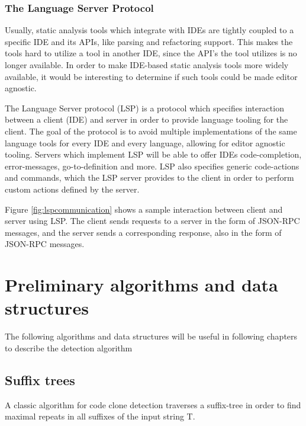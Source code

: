 \subsubsection{The Language Server Protocol}

Usually, static analysis tools which integrate with IDEs are tightly coupled to a specific
IDE and its APIs, like parsing and refactoring support. This makes the tools hard to
utilize a tool in another IDE, since the API's the tool utilizes is no longer available.
In order to make IDE-based static analysis tools more widely available, it would be
interesting to determine if such tools could be made editor agnostic.

The Language Server protocol (LSP) is a protocol which specifies interaction between a
client (IDE) and server in order to provide language tooling for the client. The goal of
the protocol is to avoid multiple implementations of the same language tools for every IDE
and every language, allowing for editor agnostic tooling. Servers which implement LSP will
be able to offer IDEs code-completion, error-messages, go-to-definition and more. LSP also
specifies generic code-actions and commands, which the LSP server provides to the client
in order to perform custom actions defined by the server.

Figure \ref{fig:lspcommunication} shows a sample interaction between client and server
using LSP. The client sends requests to a server in the form of JSON-RPC messages, and the
server sends a corresponding response, also in the form of JSON-RPC messages.

\section{Preliminary algorithms and data structures}

The following algorithms and data structures will be useful in following chapters to
describe the detection algorithm

\subsection{Suffix trees}

A classic algorithm for code clone detection traverses a suffix-tree in order to find
maximal repeats in all suffixes of the input string T.



